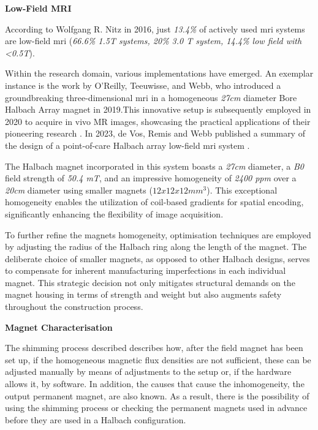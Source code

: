 \textbf{Low-Field MRI}

According to Wolfgang R. Nitz in 2016, just \emph{13.4\%} of actively
used \gls{mri} systems are low-field \gls{mri} (\emph{66.6\% 1.5T
systems, 20\% 3.0 T system, 14.4\% low field with \textless0.5T}).

Within the research domain, various implementations have emerged. An
exemplar instance is the work by O'Reilly, Teeuwisse, and Webb, who
introduced a groundbreaking three-dimensional \gls{mri} in a homogeneous
\emph{27cm} diameter Bore Halbach Array magnet  in
2019.This innovative setup is subsequently employed in 2020 to acquire
in vivo MR images, showcasing the practical applications of their
pioneering research . In 2023, de Vos, Remis and Webb
published a summary of the design of a point-of-care Halbach array
low-field \gls{mri} system .

The Halbach magnet incorporated in this system boasts a \emph{27cm}
diameter, a \emph{B0} field strength of \emph{50.4 mT}, and an
impressive homogeneity of \emph{2400 \gls{ppm}} over a \emph{20cm}
diameter using smaller magnets (\(12 x 12 x 12 mm^3\)). This exceptional
homogeneity enables the utilization of coil-based gradients for spatial
encoding, significantly enhancing the flexibility of image acquisition.

To further refine the magnets homogeneity, optimisation techniques are
employed by adjusting the radius of the Halbach ring along the length of
the magnet. The deliberate choice of smaller magnets, as opposed to
other Halbach designs, serves to compensate for inherent manufacturing
imperfections in each individual magnet. This strategic decision not
only mitigates structural demands on the magnet housing in terms of
strength and weight but also augments safety throughout the construction
process.

\textbf{Magnet Characterisation}

The shimming process described describes how, after the field magnet has
been set up, if the homogeneous magnetic flux densities are not
sufficient, these can be adjusted manually by means of adjustments to
the setup or, if the hardware allows it, by software. In addition, the
causes that cause the inhomogeneity, the output permanent magnet, are
also known. As a result, there is the possibility of using the shimming
process or checking the permanent magnets used in advance before they
are used in a Halbach configuration.

